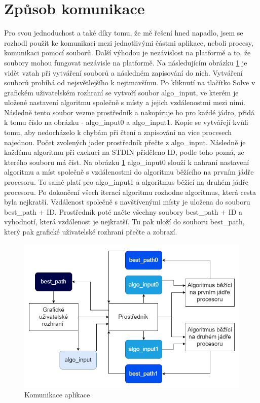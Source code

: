 \section{Způsob komunikace}\label{sec:comunication}
Pro svou jednoduchost a také díky tomu, že mě řešení hned napadlo, jsem se rozhodl použít ke komunikaci mezi jednotlivými částmi aplikace, neboli procesy, komunikaci pomocí souborů. Další výhodou je nezávislost na platformě a to, že soubory mohou fungovat nezávisle na platformě. Na následujícím obrázku \ref{fig:komunikace ap} je vidět vztah při vytváření souborů a následném zapisování do nich. Vytváření souborů probíhá od nejsvětlejšího k nejtmavšímu. Po kliknutí na tlačítko Solve v grafickém uživatelském rozhraní se vytvoří soubor algo\_input, ve kterém je uložené nastavení algoritmu společně s místy a jejich vzdálenostmi mezi nimi. Následně tento soubor vezme prostředník a nakopíruje ho pro každé jádro, přidá k tomu číslo na obrázku - algo\_input0 a algo\_input1. Kopie se vytvářejí kvůli tomu, aby nedocházelo k chybám při čtení a zapisování na více procesech najednou. Počet zvolených jader prostředník přečte z algo\_input. Následně je každému algoritmu při exekuci na STDIN přiděleno ID, podle toho pozná, ze kterého souboru má číst. Na obrázku \ref{fig:komunikace ap} algo\_input0 slouží k nahraní nastavení algoritmu a míst společně s vzdálenostmi do algoritmu běžícího na prvním jádře procesoru. To samé platí pro algo\_input1 a algoritmus běžící na druhém jádře procesoru. Po dokončení všech iterací algoritmu rozhodne algoritmus, která cesta byla nejkratší. Vzdálenost společně s navštívenými místy je uložena do souboru best\_path + ID. Prostředník poté načte všechny soubory best\_path + ID a vyhodnotí, která vzdálenost je nejkratší. Tu pak uloží do souboru best\_path, který pak grafické uživatelské rozhraní přečte a zobrazí.

\begin{figure}[H]
\includegraphics[width=15cm]{obrazky-figures/komunikace.png}
\caption{Komunikace aplikace}
\label{fig:komunikace ap}
\end{figure}
